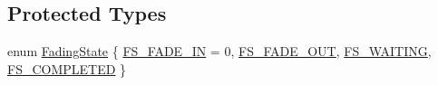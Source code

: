 \subsection*{Protected Types}
\begin{DoxyCompactItemize}
\item 
enum \hyperlink{class_fading_scene_a7de69df5a2dced68333b84561224e4c8}{FadingState} \{ \hyperlink{class_fading_scene_a7de69df5a2dced68333b84561224e4c8aa4a68082e8e8f6b4900ff975f0e3e11f}{FS\_\-FADE\_\-IN} =  0, 
\hyperlink{class_fading_scene_a7de69df5a2dced68333b84561224e4c8a71ad620245f2347d1bcf8c6fabc1cacc}{FS\_\-FADE\_\-OUT}, 
\hyperlink{class_fading_scene_a7de69df5a2dced68333b84561224e4c8a7aa5ec7f3130536a8393fda4abe3dc10}{FS\_\-WAITING}, 
\hyperlink{class_fading_scene_a7de69df5a2dced68333b84561224e4c8aaff6e6dada7c51d90f422e6b170b8e71}{FS\_\-COMPLETED}
 \}
\end{DoxyCompactItemize}


